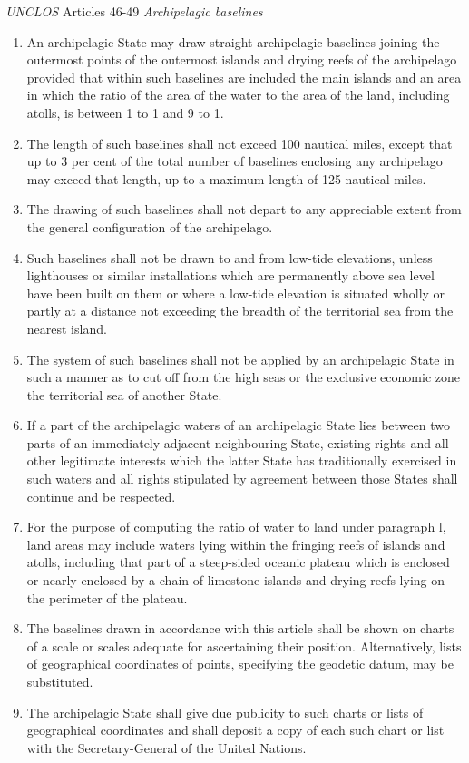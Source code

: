 \begin{conventiondetails}{\textit{UNCLOS} Articles 46-49}
    \textit{Archipelagic baselines}
    \begin{enumerate}
        \item An archipelagic State may draw straight archipelagic baselines joining the outermost points of the outermost islands and drying reefs of the archipelago provided that within such baselines are included the main islands and an area in which the ratio of the area of the water to the area of the land, including atolls, is between 1 to 1 and 9 to 1.
        \item The length of such baselines shall not exceed 100 nautical miles, except that up to 3 per cent of the total number of baselines enclosing any archipelago may exceed that length, up to a maximum length of 125 nautical miles.
        \item The drawing of such baselines shall not depart to any appreciable extent from the general configuration of the archipelago.
        \item Such baselines shall not be drawn to and from low-tide elevations, unless lighthouses or similar installations which are permanently above sea level have been built on them or where a low-tide elevation is situated wholly or partly at a distance not exceeding the breadth of the territorial sea from the nearest island.
        \item The system of such baselines shall not be applied by an archipelagic State in such a manner as to cut off from the high seas or the exclusive economic zone the territorial sea of another State.
        \item If a part of the archipelagic waters of an archipelagic State lies between two parts of an immediately adjacent neighbouring State, existing rights and all other legitimate interests which the latter State has traditionally exercised in such waters and all rights stipulated by agreement between those States shall continue and be respected.
        \item For the purpose of computing the ratio of water to land under paragraph l, land areas may include waters lying within the fringing reefs of islands and atolls, including that part of a steep-sided oceanic plateau which is enclosed or nearly enclosed by a chain of limestone islands and drying reefs lying on the perimeter of the plateau.
        \item The baselines drawn in accordance with this article shall be shown on charts of a scale or scales adequate for ascertaining their position. Alternatively, lists of geographical coordinates of points, specifying the geodetic datum, may be substituted.
        \item The archipelagic State shall give due publicity to such charts or lists of geographical coordinates and shall deposit a copy of each such chart or list with the Secretary-General of the United Nations.
    \end{enumerate}


\end{conventiondetails}
